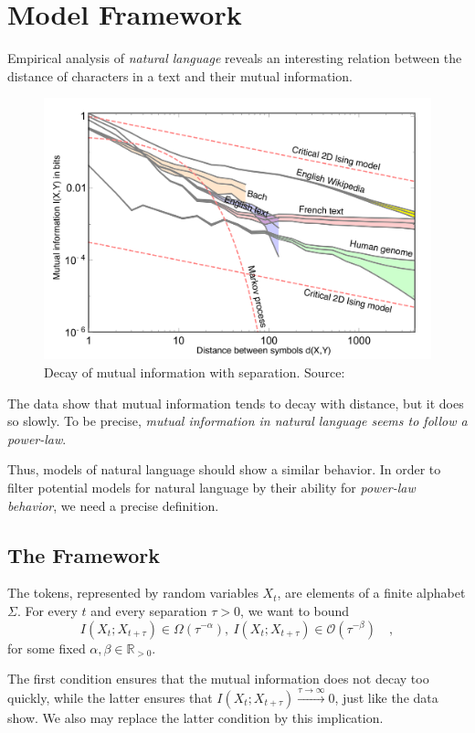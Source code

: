 \documentclass[../../main.tex]{subfiles}
\begin{document}
\section{Model Framework}
    Empirical analysis of \emph{natural language} reveals an interesting relation between the distance of characters in a text and their mutual information.

    \begin{figure}[h]
        \includegraphics*[width=\textwidth]{./natl_pl.png}
        \caption{Decay of mutual information with separation. Source: \cite{e19070299}}
    \end{figure}

    The data show that mutual information tends to decay with distance, but it does so slowly. To be precise, \emph{mutual information in natural language seems to follow a power-law}.

    Thus, models of natural language should show a similar behavior. In order to filter potential models for natural language by their ability for \emph{power-law behavior}, we need a precise definition.

\subsection{The Framework}
    The tokens, represented by random variables $X_t$, are elements of a finite alphabet $\Sigma$. For every $t$ and every separation $\tau > 0$, we want to bound
    \[
        I(X_t; X_{t + \tau}) \in \Omega(\tau^{-\alpha}), \ I(X_t; X_{t + \tau}) \in \mathcal{O}(\tau^{-\beta}) \quad ,
    \]
    for some fixed $\alpha, \beta \in \mathbb{R}_{>0}$. 
    
    The first condition ensures that the mutual information does not decay too quickly, while the latter ensures that $I(X_t; X_{t + \tau}) \xrightarrow{\tau \to \infty} 0$, just like the data show. We also may replace the latter condition by this implication.
\end{document}
